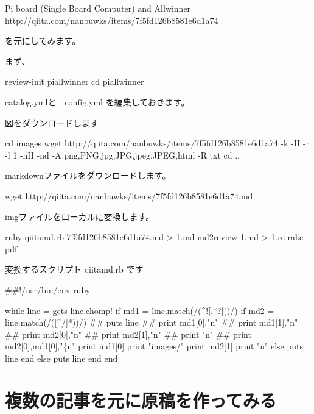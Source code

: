 Pi board (Single Board Computer) and Allwinner
http://qiita.com/nanbuwks/items/7f5fd126b8581e6d1a74

を元にしてみます。

まず、

\begin{reviewemlist}
review{-}init piallwinner
cd piallwinner
\end{reviewemlist}

catalog.ymlと　config.yml を編集しておきます。

図をダウンロードします

\begin{reviewemlist}
cd images
wget http://qiita.com/nanbuwks/items/7f5fd126b8581e6d1a74 {-}k {-}H {-}r {-}l 1 {-}nH {-}nd {-}A png,PNG,jpg,JPG,jpeg,JPEG,html  {-}R txt
cd ..
\end{reviewemlist}

markdownファイルをダウンロードします。

\begin{reviewemlist}
wget http://qiita.com/nanbuwks/items/7f5fd126b8581e6d1a74.md
\end{reviewemlist}

imgファイルをローカルに変換します。

\begin{reviewemlist}
ruby qiitamd.rb 7f5fd126b8581e6d1a74.md \textgreater{} 1.md
md2review 1.md \textgreater{} 1.re
rake pdf
\end{reviewemlist}

変換するスクリプト qiitamd.rb です

\begin{reviewemlist}
\#\#!/usr/bin/env ruby

while line = gets
  line.chomp!
  if md1 = line.match(/(\textasciicircum{}!\reviewbackslash{}[.*?\reviewbackslash{}]\reviewbackslash{}()/)
    if md2 = line.match(/([\textasciicircum{}\reviewbackslash{}/]*\reviewbackslash{}))/)
\#\#      puts line
\#\#      print md1[0],"\reviewbackslash{}n"
\#\#      print md1[1],"\reviewbackslash{}n"
\#\#      print md2[0],"\reviewbackslash{}n"
\#\#      print md2[1],"\reviewbackslash{}n"
\#\#      print "\reviewbackslash{}n"
\#\#      print md2[0],md1[0],"\{\reviewbackslash{}n"
      print md1[0]
      print "images/"
      print md2[1]
      print "\reviewbackslash{}n"
    else
      puts line
    end
  else
   puts line
  end
end

\end{reviewemlist}

\section{複数の記事を元に原稿を作ってみる}
\label{sec:5-5}

